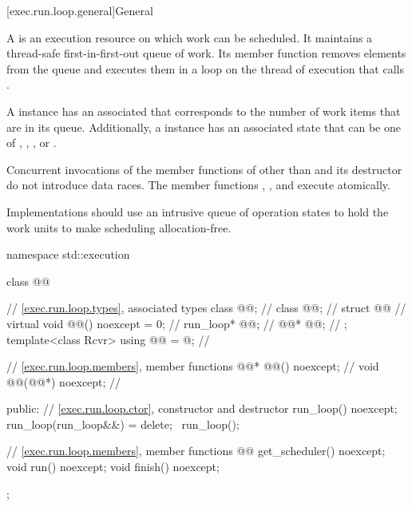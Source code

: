 [exec.run.loop.general]{General}

\pnum
A  is an execution resource on which work can be scheduled.
It maintains a thread-safe first-in-first-out queue of work.
Its  member function removes elements from the queue and
executes them in a loop on the thread of execution that calls .

\pnum
A  instance has an associated 
that corresponds to the number of work items that are in its queue.
Additionally, a  instance has an associated state
that can be one of
, , , or .

\pnum
Concurrent invocations of the member functions of 
other than  and its destructor do not introduce data races.
The member functions
, , and 
execute atomically.

\pnum
\recommended
Implementations should use an intrusive queue of operation states
to hold the work units to make scheduling allocation-free.

\begin{codeblock}
namespace std::execution {
  class @@ {
    // \ref{exec.run.loop.types}, associated types
    class @@;                                   // \expos
    class @@;                                      // \expos
    struct @@ {                              // \expos
      virtual void @@() noexcept = 0;                      // \expos
      run_loop* @@;                                           // \expos
      @@* @@;                              // \expos
    };
    template<class Rcvr>
      using @@ = @\unspec@;                     // \expos

    // \ref{exec.run.loop.members}, member functions
    @@* @@() noexcept;                // \expos
    void @@(@@*) noexcept;            // \expos

  public:
    // \ref{exec.run.loop.ctor}, constructor and destructor
    run_loop() noexcept;
    run_loop(run_loop&&) = delete;
    ~run_loop();

    // \ref{exec.run.loop.members}, member functions
    @@ get_scheduler() noexcept;
    void run() noexcept;
    void finish() noexcept;
  };
}
\end{codeblock}

